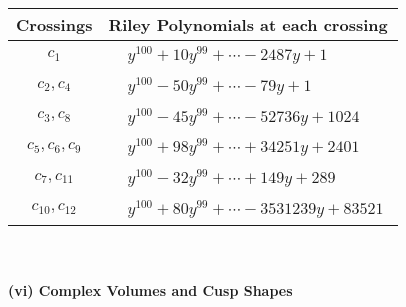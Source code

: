 \documentclass[1p]{elsarticle_modified}
\theoremstyle{definition}
\begin{document}
\begin{tabular}{m{50pt}|m{274pt}}
Crossings & \hspace{64pt}Riley Polynomials at each crossing \\
\hline $$\begin{aligned}c_{1}\end{aligned}$$&$\begin{aligned}
&y^{100}+10 y^{99}+\cdots-2487 y+1
\end{aligned}$\\
\hline $$\begin{aligned}c_{2},c_{4}\end{aligned}$$&$\begin{aligned}
&y^{100}-50 y^{99}+\cdots-79 y+1
\end{aligned}$\\
\hline $$\begin{aligned}c_{3},c_{8}\end{aligned}$$&$\begin{aligned}
&y^{100}-45 y^{99}+\cdots-52736 y+1024
\end{aligned}$\\
\hline $$\begin{aligned}c_{5},c_{6},c_{9}\end{aligned}$$&$\begin{aligned}
&y^{100}+98 y^{99}+\cdots+34251 y+2401
\end{aligned}$\\
\hline $$\begin{aligned}c_{7},c_{11}\end{aligned}$$&$\begin{aligned}
&y^{100}-32 y^{99}+\cdots+149 y+289
\end{aligned}$\\
\hline $$\begin{aligned}c_{10},c_{12}\end{aligned}$$&$\begin{aligned}
&y^{100}+80 y^{99}+\cdots-3531239 y+83521
\end{aligned}$\\
\hline
\end{tabular}\\~\\
\newpage\flushleft \textbf{(vi) Complex Volumes and Cusp Shapes}
\end{document}
